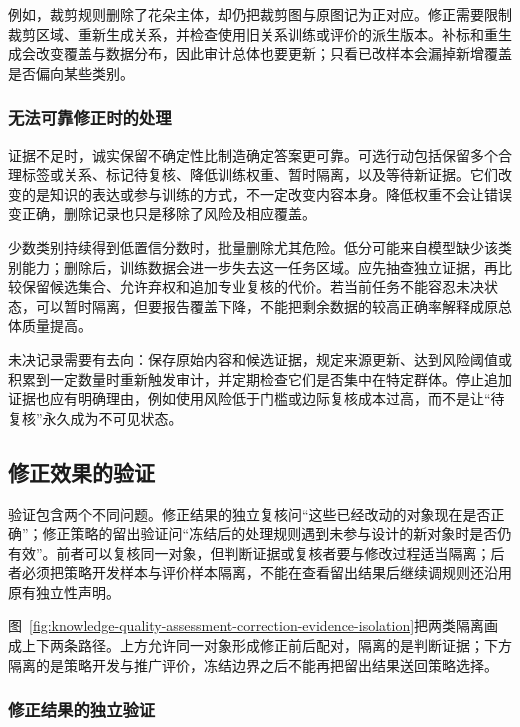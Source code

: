 例如，裁剪规则删除了花朵主体，却仍把裁剪图与原图记为正对应。修正需要限制裁剪区域、重新生成关系，并检查使用旧关系训练或评价的派生版本。补标和重生成会改变覆盖与数据分布，因此审计总体也要更新；只看已改样本会漏掉新增覆盖是否偏向某些类别。

\subsubsection{无法可靠修正时的处理}
\label{sec:knowledge-quality-assessment-correction-unresolved}

证据不足时，诚实保留不确定性比制造确定答案更可靠。可选行动包括保留多个合理标签或关系、标记待复核、降低训练权重、暂时隔离，以及等待新证据。它们改变的是知识的表达或参与训练的方式，不一定改变内容本身。降低权重不会让错误变正确，删除记录也只是移除了风险及相应覆盖。

少数类别持续得到低置信分数时，批量删除尤其危险。低分可能来自模型缺少该类别能力；删除后，训练数据会进一步失去这一任务区域。应先抽查独立证据，再比较保留候选集合、允许弃权和追加专业复核的代价。若当前任务不能容忍未决状态，可以暂时隔离，但要报告覆盖下降，不能把剩余数据的较高正确率解释成原总体质量提高。

未决记录需要有去向：保存原始内容和候选证据，规定来源更新、达到风险阈值或积累到一定数量时重新触发审计，并定期检查它们是否集中在特定群体。停止追加证据也应有明确理由，例如使用风险低于门槛或边际复核成本过高，而不是让“待复核”永久成为不可见状态。

\subsection{修正效果的验证}
\label{sec:knowledge-quality-assessment-correction-repair-validation}

验证包含两个不同问题。修正结果的独立复核问“这些已经改动的对象现在是否正确”；修正策略的留出验证问“冻结后的处理规则遇到未参与设计的新对象时是否仍有效”。前者可以复核同一对象，但判断证据或复核者要与修改过程适当隔离；后者必须把策略开发样本与评价样本隔离，不能在查看留出结果后继续调规则还沿用原有独立性声明。

图~\ref{fig:knowledge-quality-assessment-correction-evidence-isolation}把两类隔离画成上下两条路径。上方允许同一对象形成修正前后配对，隔离的是判断证据；下方隔离的是策略开发与推广评价，冻结边界之后不能再把留出结果送回策略选择。

\subsubsection{修正结果的独立验证}
\label{sec:knowledge-quality-assessment-correction-independent-validation}

